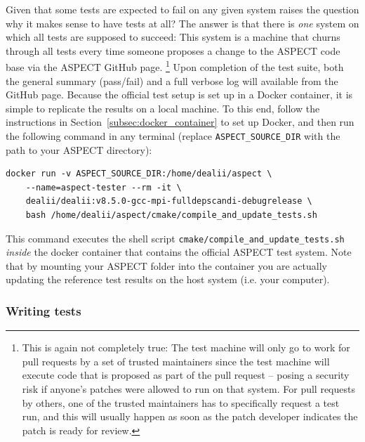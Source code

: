 \documentclass{article}
\newcommand{\aspect}{\textsc{ASPECT}}
\begin{document}
Given that some tests are expected to fail on any given system raises the
question why it makes sense to have tests at all? The answer is that there is
\textit{one} system on which all tests are supposed to succeed: This system is a
machine that churns through all tests every time someone proposes a change to
the \aspect{} code base via the \aspect{} GitHub page.%
\footnote{This is again not completely true: The test machine will only go to
work for pull requests by a set of trusted maintainers since the test machine
will execute code that is proposed as part of the pull request -- posing a
security risk if anyone's patches were allowed to run on that system. For pull
requests by others, one of the trusted maintainers has to specifically request a
test run, and this will usually happen
as soon as the patch developer indicates the patch is ready for review.}
Upon completion of the test suite, both the general summary (pass/fail) and a
full verbose log will available from the GitHub page. Because the official test
setup is set up in a Docker container, it is simple to replicate the results on
a local machine. To this end, follow the instructions in
Section~\ref{subsec:docker_container} to set up Docker, and then run the
following command in any terminal (replace \texttt{ASPECT\_SOURCE\_DIR} with
the path to your \aspect{} directory):
\begin{lstlisting}[frame=single,language=ksh] 
    docker run -v ASPECT_SOURCE_DIR:/home/dealii/aspect \
    --name=aspect-tester --rm -it \
    dealii/dealii:v8.5.0-gcc-mpi-fulldepscandi-debugrelease \
    bash /home/dealii/aspect/cmake/compile_and_update_tests.sh
\end{lstlisting}

This command executes the shell script 
\texttt{cmake/compile\_and\_update\_tests.sh} \textit{inside} the docker
container that contains the official \aspect{} test system. Note that by
mounting your \aspect{} folder into the container you are actually updating the
reference test results on the host system (i.e. your computer).


\subsubsection{Writing tests}
\label{sec:writing_tests}
\end{document}
